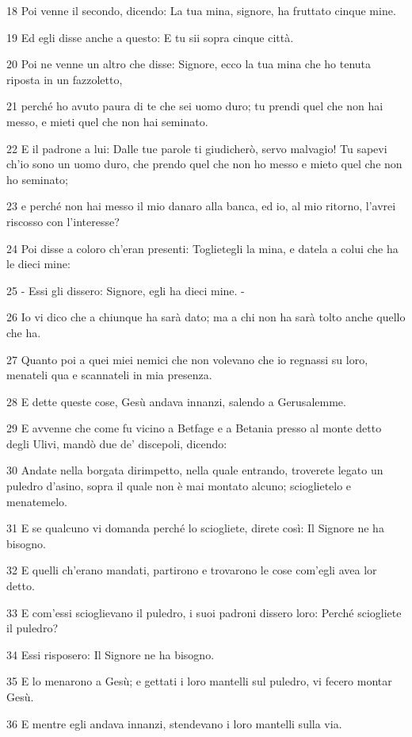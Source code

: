 \par 18 Poi venne il secondo, dicendo: La tua mina, signore, ha fruttato cinque mine.
\par 19 Ed egli disse anche a questo: E tu sii sopra cinque città.
\par 20 Poi ne venne un altro che disse: Signore, ecco la tua mina che ho tenuta riposta in un fazzoletto,
\par 21 perché ho avuto paura di te che sei uomo duro; tu prendi quel che non hai messo, e mieti quel che non hai seminato.
\par 22 E il padrone a lui: Dalle tue parole ti giudicherò, servo malvagio! Tu sapevi ch'io sono un uomo duro, che prendo quel che non ho messo e mieto quel che non ho seminato;
\par 23 e perché non hai messo il mio danaro alla banca, ed io, al mio ritorno, l'avrei riscosso con l'interesse?
\par 24 Poi disse a coloro ch'eran presenti: Toglietegli la mina, e datela a colui che ha le dieci mine:
\par 25 - Essi gli dissero: Signore, egli ha dieci mine. -
\par 26 Io vi dico che a chiunque ha sarà dato; ma a chi non ha sarà tolto anche quello che ha.
\par 27 Quanto poi a quei miei nemici che non volevano che io regnassi su loro, menateli qua e scannateli in mia presenza.
\par 28 E dette queste cose, Gesù andava innanzi, salendo a Gerusalemme.
\par 29 E avvenne che come fu vicino a Betfage e a Betania presso al monte detto degli Ulivi, mandò due de' discepoli, dicendo:
\par 30 Andate nella borgata dirimpetto, nella quale entrando, troverete legato un puledro d'asino, sopra il quale non è mai montato alcuno; scioglietelo e menatemelo.
\par 31 E se qualcuno vi domanda perché lo sciogliete, direte così: Il Signore ne ha bisogno.
\par 32 E quelli ch'erano mandati, partirono e trovarono le cose com'egli avea lor detto.
\par 33 E com'essi scioglievano il puledro, i suoi padroni dissero loro: Perché sciogliete il puledro?
\par 34 Essi risposero: Il Signore ne ha bisogno.
\par 35 E lo menarono a Gesù; e gettati i loro mantelli sul puledro, vi fecero montar Gesù.
\par 36 E mentre egli andava innanzi, stendevano i loro mantelli sulla via.
